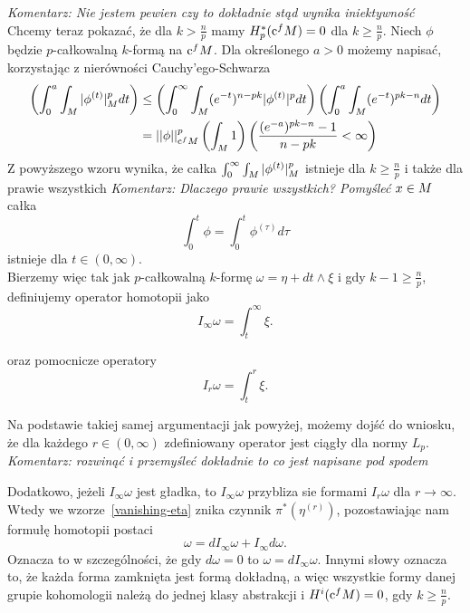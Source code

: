 \documentclass[licencjacka]{pracamgr}
\theoremstyle{definition}
\theoremstyle{definition}
\theoremstyle{plain}
\theoremstyle{plain}
\theoremstyle{plain}
\theoremstyle{plain}
\def\cfm{\ensuremath\mathrm{c}^fM}
\def\M{\ensuremath M}
\begin{document}
\emph{Komentarz: Nie jestem pewien czy to dokładnie stąd wynika iniektywność} \\

Chcemy teraz pokazać, że dla $k > \frac{n}{p}$ mamy $H^\ast_p(\cfm) = 0$ dla
$k \geq \frac{n}{p}$. Niech $\phi$ będzie $p$-całkowalną $k$-formą na
$\cfm$. Dla określonego $a > 0$ możemy napisać, korzystając z nierówności
Cauchy'ego-Schwarza
\begin{align*}
\left(
    \int_0^a \int_\M |\phi^{(t)}|_M^p dt
\right) & \leq 
\left(
    \int_0^\infty \int_\M (e^{-t})^{n-pk} |\phi^{(t)}|^p dt
\right)
\left(
    \int_0^a \int_\M (e^{-t})^{pk-n} dt 
\right) \\
&= 
    ||\phi||_{\cfm}^p 
\left(
    \int_\M 1
\right)
\left(
    \frac{ (e^{-a})^{pk-n} - 1 }{n-pk} < \infty
\right) \\
\end{align*}
Z powyższego wzoru wynika, że całka $\int_0^\infty \int_\M |\phi^{(t)}|_M^p$ 
istnieje dla $k \geq \frac{n}{p}$ i także dla prawie wszystkich
\emph{Komentarz: Dlaczego prawie wszystkich? Pomyśleć}
$x \in \M$ całka
\[
\int_0^t \phi = \int_0^t \phi^{(\tau)} d\tau
\]
istnieje dla $t \in (0, \infty)$. \\

Bierzemy więc tak jak $p$-całkowalną $k$-formę $\omega = \eta + dt \wedge \xi$
i gdy $k-1 \geq \frac{n}{p}$, definiujemy operator homotopii jako
\[
I_\infty \omega = \int_t^\infty \xi.
\]

oraz pomocnicze operatory
\[
I_r \omega = \int_t^r \xi.
\]

Na podstawie takiej samej argumentacji jak powyżej, możemy dojść do wniosku, że
dla każdego $r \in (0, \infty)$ zdefiniowany operator jest ciągły dla normy
$L_p$. \\

\emph{Komentarz: rozwinąć i przemyśleć dokładnie to co jest napisane pod spodem}

Dodatkowo, jeżeli 
$I_\infty\omega$ jest gładka, to $I_\infty\omega$ przybliza sie
formami $I_r\omega$ dla $r \rightarrow \infty$.
Wtedy we wzorze~\ref{vanishing-eta} znika czynnik
    $\pi^\ast \left( \eta^{(r)} \right)$, pozostawiając nam formułę homotopii
postaci
\[
\omega = dI_\infty \omega + I_\infty d \omega.
\]
Oznacza to w szczególności, że gdy $d \omega = 0$ to $\omega = d I_\infty
\omega$. Innymi słowy oznacza to, że każda forma zamknięta jest formą dokładną,
a więc wszystkie formy danej grupie kohomologii należą do jednej klasy
abstrakcji i $H^i(\cfm) = 0$, gdy $k \geq \frac{n}{p}$. \\
\end{document}
